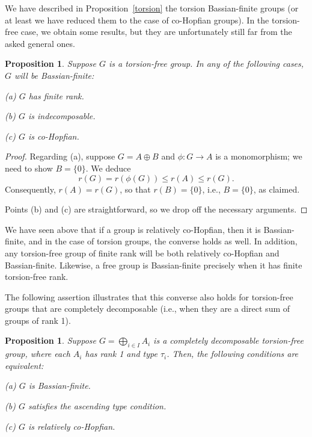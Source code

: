 \documentclass[12pt]{amsart}
\newtheorem{proposition}[theorem]{Proposition}
\theoremstyle{definition}
\begin{document}
We have described in Proposition~\ref{torsion} the torsion Bassian-finite groups (or at least we have reduced them to the case of co-Hopfian groups). In the torsion-free case, we obtain some results, but they are unfortunately still far from the asked general ones.

\begin{proposition}\label{indec} Suppose $G$ is a torsion-free group. In any of the following cases, $G$ will be Bassian-finite:

(a) $G$ has finite rank.

(b) $G$ is indecomposable.

(c) $G$ is co-Hopfian.
\end{proposition}

\begin{proof}
Regarding (a), suppose $G=A\oplus B$ and $\phi:G\to A$ is a monomorphism; we need to show $B=\{0\}$. We deduce
$$
         r(G)=r(\phi(G))\leq r(A)\leq r(G).
$$
Consequently, $r(A)=r(G)$, so that $r(B)=\{0\}$, i.e., $B=\{0\}$, as claimed.

Points (b) and (c) are straightforward, so we drop off the necessary arguments.
\end{proof}

We have seen above that if a group is relatively co-Hopfian, then it is Bassian-finite, and in the case of torsion groups, the converse holds as well. In addition, any torsion-free group of finite rank will be both relatively co-Hopfian and Bassian-finite. Likewise, a free group is Bassian-finite precisely when it has finite torsion-free rank.

\medskip

The following assertion illustrates that this converse also holds for torsion-free groups that are completely decomposable (i.e., when they are a direct sum of groups of rank 1).

\begin{proposition}\label{cdconditions}
Suppose $G=\bigoplus_{i\in I}A_i$ is a completely decomposable torsion-free group, where each $A_i$ has rank 1 and type $\tau_i$. Then, the following conditions are equivalent:

(a) $G$ is Bassian-finite.

(b) $G$ satisfies the ascending type condition.

(c) $G$ is relatively co-Hopfian.
\end{proposition}
\end{document}
